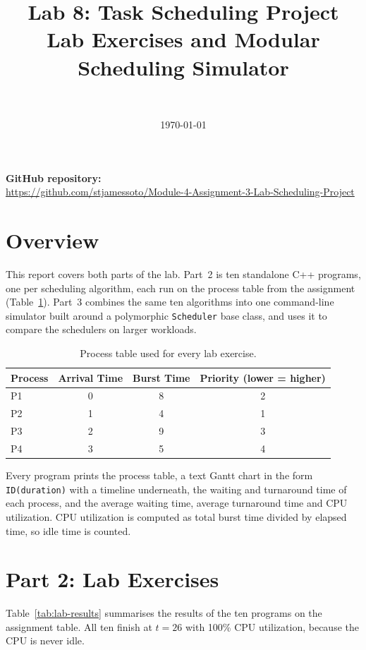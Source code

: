 \documentclass[11pt]{article}
\title{Lab 8: Task Scheduling Project\\[4pt]\large Lab Exercises and Modular Scheduling Simulator}
\author{\studentname\\\coursename}
\date{\today}
\newcommand{\repolink}{https://github.com/stjamessoto/Module-4-Assignment-3-Lab-Scheduling-Project}
\begin{document}
\maketitle

\noindent\textbf{GitHub repository:}\\\url{\repolink}

\tableofcontents
\newpage

\section{Overview}

This report covers both parts of the lab. Part~2 is ten standalone C++ programs, one per
scheduling algorithm, each run on the process table from the assignment
(Table~\ref{tab:processes}). Part~3 combines the same ten algorithms into one command-line
simulator built around a polymorphic \texttt{Scheduler} base class, and uses it to compare
the schedulers on larger workloads.

\begin{table}[H]
  \centering
  \begin{tabular}{lccc}
    \toprule
    Process & Arrival Time & Burst Time & Priority (lower = higher) \\
    \midrule
    P1 & 0 & 8 & 2 \\
    P2 & 1 & 4 & 1 \\
    P3 & 2 & 9 & 3 \\
    P4 & 3 & 5 & 4 \\
    \bottomrule
  \end{tabular}
  \caption{Process table used for every lab exercise.}
  \label{tab:processes}
\end{table}

Every program prints the process table, a text Gantt chart in the form \texttt{ID(duration)}
with a timeline underneath, the waiting and turnaround time of each process, and the
average waiting time, average turnaround time and CPU utilization. CPU utilization is
computed as total burst time divided by elapsed time, so idle time is counted.

\section{Part 2: Lab Exercises}

Table~\ref{tab:lab-results} summarises the results of the ten programs on the assignment
table. All ten finish at $t = 26$ with 100\% CPU utilization, because the CPU is never idle.
\end{document}
